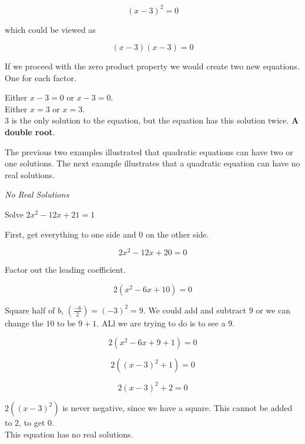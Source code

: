 \documentclass{ximera}
\begin{document}
\[  (x - 3)^2 = 0  \]

which could be viewed as 

\[  (x - 3) (x - 3) = 0  \]


If we proceed with the zero product property we would create two new equations.  One for each factor.

Either $x - 3 = 0$   or $x - 3 = 0$. \\

Either $x = 3$ or $x = 3$.  \\

$3$ is the only solution to the equation, but the equation has this solution twice. \textbf{\textcolor{red!90!darkgray}{A double root}}.


The previous two examples illustrated that quadratic equations can have two or one solutions.  The next example illustrates that a quadratic equation can have no real solutions.










\begin{example} \textit{No Real Solutions}

Solve $2 x^2 - 12x + 21 = 1$ \\

\begin{explanation}

First, get everything to one side and $0$ on the other side.



\[  2 x^2 - 12x + 20 = 0  \]

Factor out the leading coefficient.

\[  2 (x^2 - 6x + 10) = 0  \]


Square half of $b$, $\left(\frac{-6}{2}\right) = (-3)^2 = 9$.  We could add and subtract $9$ or we can change the $10$ to be $9+1$.  ALl we are trying to do is to see a $9$.



\[  2 (x^2 - 6x + 9 + 1) = 0  \]


\[  2 ((x-3)^2 + 1) = 0  \]


\[  2 (x-3)^2 + 2 = 0  \]

$2 ((x-3)^2)$ is never negative, since we have a square.  This cannot be added to $2$, to get $0$.  \\


This equation has no real solutions.


\end{explanation}
\end{example}
\end{document}
